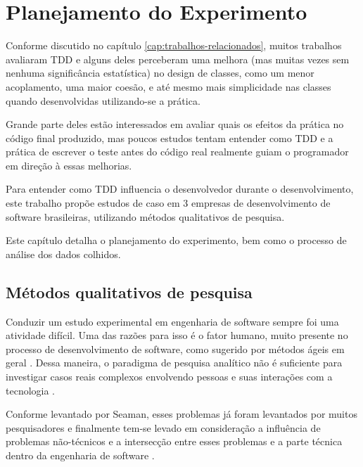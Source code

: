 \chapter{Planejamento do Experimento}
\label{cap:planejamento}

Conforme discutido no capítulo \ref{cap:trabalhos-relacionados}, muitos 
trabalhos avaliaram TDD e alguns deles perceberam uma melhora (mas muitas vezes
sem nenhuma significância estatística) no design de classes, como um menor 
acoplamento, uma maior coesão, e até mesmo mais simplicidade nas classes quando
desenvolvidas utilizando-se a prática. 

Grande parte deles estão interessados em avaliar quais os efeitos da prática
no código final produzido, mas poucos estudos tentam entender como TDD e a
prática de escrever o teste antes do código real realmente guiam o programador 
em direção à essas melhorias.

Para entender como TDD influencia o desenvolvedor durante o desenvolvimento,
este trabalho propõe estudos de caso em 3 empresas de desenvolvimento de
software brasileiras, utilizando métodos qualitativos de pesquisa.

Este capítulo detalha o planejamento do experimento, bem como o processo de
análise dos dados colhidos.

\section{Métodos qualitativos de pesquisa} 
\label{sec:planejamento-qualitativa}

Conduzir um estudo experimental em engenharia de software sempre foi uma
atividade difícil. Uma das razões para isso é o fator humano, muito presente 
no processo de desenvolvimento de software, como sugerido por métodos ágeis  em
geral \cite{AgileManifesto}. Dessa maneira, o paradigma de pesquisa analítico 
não é suficiente para investigar casos reais complexos envolvendo pessoas e 
suas interações com a tecnologia \cite{guidelines-case-study}.

Conforme levantado por Seaman, esses problemas já foram levantados por muitos
pesquisadores e finalmente tem-se levado em consideração a influência de
problemas não-técnicos e a intersecção entre esses problemas e a parte técnica
dentro da engenharia de software \cite{seaman}. 


